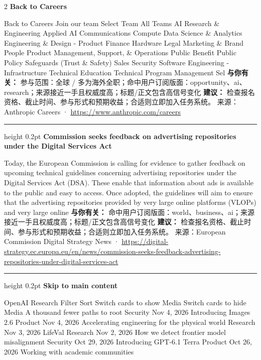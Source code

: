 \documentclass[10.5pt]{ctexart}
\begin{document}
\begin{multicols}{2}
{\large\bfseries Back to Careers}\par
Back to Careers Join our team Select Team All Teams AI Research \& Engineering Applied AI Communications Compute Data Science \& Analytics Engineering \& Design - Product Finance Hardware Legal Marketing \& Brand People Product Management, Support, \& Operations Public Benefit Public Policy Safeguards (Trust \& Safety) Sales Security Software Engineering - Infrastructure Technical Education Technical Program Management Sel
\textbf{与你有关：} 参与范围：全球 / 多为海外全职；命中用户订阅版面：opportunity、ai、research；来源接近一手且权威度高；标题/正文包含高信号变化
\textbf{建议：} 检查报名资格、截止时间、参与形式和预期收益；合适则立即加入任务系统。
{\footnotesize\color{ormuted} 来源：Anthropic Careers · \url{https://www.anthropic.com/careers}}
\vspace{2mm}
\hrule height 0.2pt
\vspace{2mm}
{\large\bfseries Commission seeks feedback on advertising repositories under the Digital Services Act}\par
Today, the European Commission is calling for evidence to gather feedback on upcoming technical guidelines concerning advertising repositories under the Digital Services Act (DSA). These enable that information about ads is available to the public and easy to access. Once adopted, the guidelines will aim to ensure that the advertising repositories provided by very large online platforms (VLOPs) and very large online 
\textbf{与你有关：} 命中用户订阅版面：world、business、ai；来源接近一手且权威度高；标题/正文包含高信号变化
\textbf{建议：} 检查报名资格、截止时间、参与形式和预期收益；合适则立即加入任务系统。
{\footnotesize\color{ormuted} 来源：European Commission Digital Strategy News · \url{https://digital-strategy.ec.europa.eu/en/news/commission-seeks-feedback-advertising-repositories-under-digital-services-act}}
\vspace{2mm}
\hrule height 0.2pt
\vspace{2mm}
{\large\bfseries Skip to main content}\par
OpenAI Research Filter Sort Switch cards to show Media Switch cards to hide Media A thousand fewer paths to root Security Nov 4, 2026 Introducing Images 2.6 Product Nov 4, 2026 Accelerating engineering for the physical world Research Nov 3, 2026 LifeVal Research Nov 2, 2026 How we detect frontier model misalignment Security Oct 29, 2026 Introducing GPT-6.1 Terra Product Oct 26, 2026 Working with academic communities 

\end{multicols}
\end{document}
